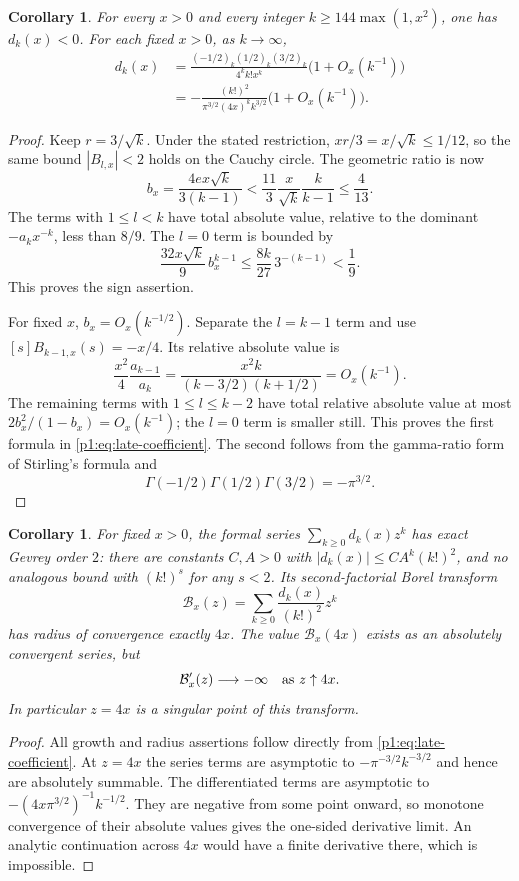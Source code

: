 \documentclass[11pt,a4paper]{article}
\newtheorem{corollary}[theorem]{Corollary}
\theoremstyle{definition}
\theoremstyle{remark}
\numberwithin{equation}{section}
\begin{document}
\begin{corollary}\label{p1:cor:uniform-sign}
For every $x>0$ and every integer $k\geq144\max(1,x^2)$, one has
$d_k(x)<0$. For each fixed $x>0$, as $k\to\infty$,
\begin{align}
 d_k(x)
 &=\frac{(-1/2)_k(1/2)_k(3/2)_k}{4^k k!x^k}
       \bigl(1+O_x(k^{-1})\bigr)\label{p1:eq:late-coefficient}\\
 &=-\frac{(k!)^2}{\pi^{3/2}(4x)^k k^{3/2}}
       \bigl(1+O_x(k^{-1})\bigr).\nonumber
\end{align}
\end{corollary}
\begin{proof}
Keep $r=3/\sqrt k$. Under the stated restriction,
$x r/3=x/\sqrt k\leq1/12$, so the same bound
$|B_{l,x}|<2$ holds on the Cauchy circle. The geometric ratio is now
\[
 b_x=\frac{4ex\sqrt k}{3(k-1)}
 <\frac{11}{3}\frac{x}{\sqrt k}\frac{k}{k-1}
 \leq\frac4{13}.
\]
The terms with $1\leq l<k$ have total absolute value, relative to the
dominant $-a_kx^{-k}$, less than $8/9$. The $l=0$ term is bounded by
\[
 \frac{32x\sqrt k}{9}\,b_x^{k-1}
 \leq\frac{8k}{27}\,3^{-(k-1)}<\frac19.
\]
This proves the sign assertion.

For fixed $x$, $b_x=O_x(k^{-1/2})$. Separate the $l=k-1$ term and use
$[s]B_{k-1,x}(s)=-x/4$. Its relative absolute value is
\[
 \frac{x^2}{4}\frac{a_{k-1}}{a_k}
 =\frac{x^2k}{(k-3/2)(k+1/2)}=O_x(k^{-1}).
\]
The remaining terms with $1\leq l\leq k-2$ have total relative
absolute value at most $2b_x^2/(1-b_x)=O_x(k^{-1})$; the $l=0$ term
is smaller still. This proves the first formula in
\eqref{p1:eq:late-coefficient}. The second follows from the gamma-ratio
form of Stirling's formula and
\[
 \Gamma(-1/2)\Gamma(1/2)\Gamma(3/2)=-\pi^{3/2}.
\]
\end{proof}

\begin{corollary}\label{p1:cor:second-factorial-borel}
For fixed $x>0$, the formal series $\sum_{k\geq0}d_k(x)z^k$ has
exact Gevrey order $2$: there are constants $C,A>0$ with
$|d_k(x)|\leq CA^k(k!)^2$, and no analogous bound with $(k!)^s$
for any $s<2$. Its second-factorial Borel transform
\[
 \mathcal B_x(z)=\sum_{k\geq0}\frac{d_k(x)}{(k!)^2}z^k
\]
has radius of convergence exactly $4x$. The value
$\mathcal B_x(4x)$ exists as an absolutely convergent series, but
\[
 \mathcal B_x'(z)\longrightarrow-\infty
       \quad\hbox{as }z\uparrow4x.
\]
In particular $z=4x$ is a singular point of this transform.
\end{corollary}
\begin{proof}
All growth and radius assertions follow directly from
\eqref{p1:eq:late-coefficient}. At $z=4x$ the series terms are
asymptotic to $-\pi^{-3/2}k^{-3/2}$ and hence are absolutely summable.
The differentiated terms are asymptotic to
$-(4x\pi^{3/2})^{-1}k^{-1/2}$. They are negative from some point
onward, so monotone convergence of their absolute values gives the
one-sided derivative limit. An analytic continuation across $4x$
would have a finite derivative there, which is impossible.
\end{proof}
\end{document}
